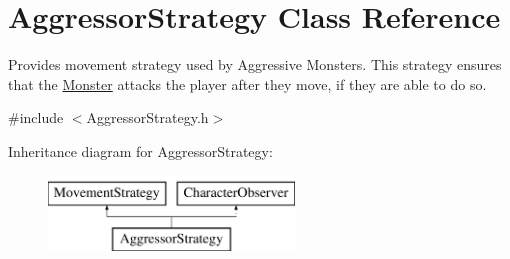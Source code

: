 \hypertarget{class_aggressor_strategy}{}\section{Aggressor\+Strategy Class Reference}
\label{class_aggressor_strategy}


Provides movement strategy used by Aggressive Monsters. This strategy ensures that the \hyperlink{class_monster}{Monster} attacks the player after they move, if they are able to do so.  




{\ttfamily \#include $<$Aggressor\+Strategy.\+h$>$}

Inheritance diagram for Aggressor\+Strategy\+:\begin{figure}[H]
\begin{center}
\leavevmode
\includegraphics[height=2.000000cm]{class_aggressor_strategy}
\end{center}
\end{figure}
